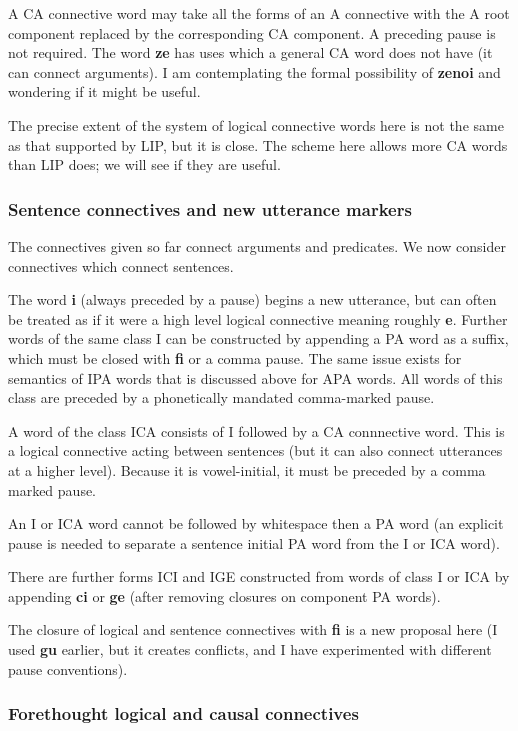 \documentclass[12pt]{book}
\begin{document}
{A CA connective word may take all the forms of an A connective with the A root component replaced by the corresponding CA component.   A preceding pause is not required.  The word {\bf ze} has uses which a general CA word does not have (it can connect arguments).  I am contemplating the formal possibility of {\bf zenoi} and wondering if it might be useful.  

The precise extent of the system of logical connective words here is not the same as that supported by LIP, but it is close.  The scheme here allows more CA words than LIP does; we will see if they are useful.

\subsubsection{Sentence connectives and new utterance markers}

The connectives given so far connect arguments and predicates.   We now consider connectives which connect sentences.

The word {\bf i} (always preceded by a pause) begins a new utterance, but can often be treated as if it were a high level logical connective meaning roughly {\bf e}.  Further words of the same class I can be constructed by appending a PA word as a suffix, which must be closed with {\bf fi} or a comma pause.  The same issue exists for semantics of IPA words that is discussed above for APA words.   All words of this class are preceded by a phonetically mandated comma-marked pause.

A word of the class ICA consists of I followed by a CA connnective word.   This is a logical connective acting between sentences (but it can also connect utterances at a higher level).   Because it is vowel-initial, it must be preceded
by a comma marked pause.

An I or ICA word cannot be followed by whitespace then a PA word (an explicit pause is needed to separate a sentence initial PA word from the I or ICA word).

There are further forms ICI and IGE constructed from words of class I or ICA  by appending {\bf ci} or {\bf ge} (after removing closures on component PA words).

The closure of logical and sentence connectives with {\bf fi} is a new proposal here (I used {\bf gu} earlier, but it creates conflicts, and I have experimented with different pause conventions).

\subsubsection{Forethought logical and causal connectives}

}
\end{document}
